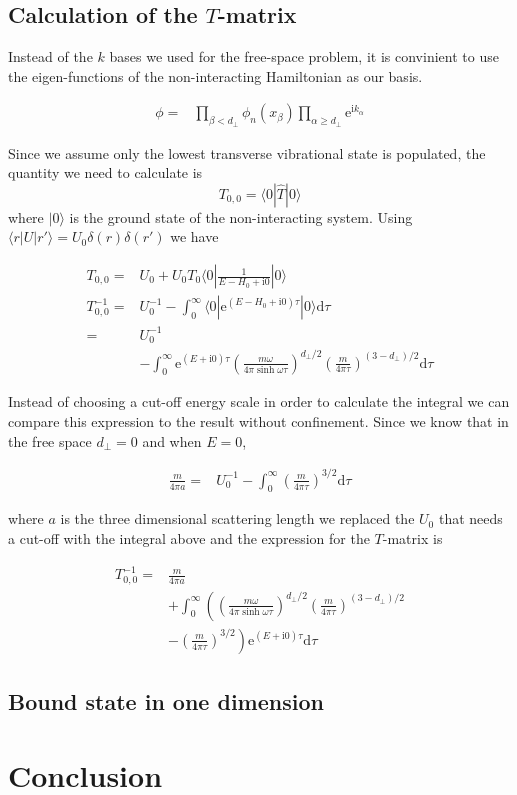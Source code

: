 \documentclass[aps,twocolumn,secnumarabic,balancelastpage,amsmath,amssymb,nofootinbib]{revtex4}
\newcommand{\ud}{\mathrm{d}}
\newcommand{\ue}{\mathrm{e}}
\newcommand{\ui}{\mathrm{i}}
\newcommand{\eqar}[1]
{
  \begin{align*}
    #1
  \end{align*}
}
\newcommand{\paren}[1]{{\left({#1}\right)}}
\newcommand{\lparen}[1]{{\left({#1}\right.}}
\newcommand{\rparen}[1]{{\left.{#1}\right)}}
\begin{document}
\subsection{Calculation of the $T$-matrix}
Instead of the $k$ bases we used for the free-space problem, it is convinient to use the eigen-functions of the non-interacting Hamiltonian as our basis.
\eqar{
  \phi=&\prod_{\beta<d_\perp}\phi_n\paren{x_\beta}\prod_{\alpha\geqslant d_\perp}\ue^{\ui k_\alpha}
}
Since we assume only the lowest transverse vibrational state is populated, the quantity we need to calculate is
\[T_{0,0}=\langle0|\hat T|0\rangle\]
where $|0\rangle$ is the ground state of the non-interacting system. Using $\langle r|U|r'\rangle=U_0\delta\paren{r}\delta\paren{r'}$ we have
\eqar{
  T_{0,0}=&U_0+U_0T_0\langle0|\frac{1}{E-H_0+\ui0}|0\rangle\\
  T_{0,0}^{-1}=&U_0^{-1}-\int_0^\infty\langle0|\ue^{\paren{E-H_0+\ui0}\tau}|0\rangle\ud\tau\\
  =&U_0^{-1}\\
  &-\int_0^\infty\ue^{\paren{E+\ui0}\tau}\paren{\frac{m\omega}{4\pi\sinh\omega\tau}}^{d_\perp/2}\paren{\frac{m}{4\pi\tau}}^{\paren{3-d_\perp}/2}\ud\tau
}
Instead of choosing a cut-off energy scale in order to calculate the integral we can compare this expression to the result without confinement. Since we know that in the free space $d_\perp=0$ and when $E=0$,
\eqar{
  \frac{m}{4\pi a}=&U_0^{-1}-\int_0^\infty\paren{\frac{m}{4\pi\tau}}^{3/2}\ud\tau
}
where $a$ is the three dimensional scattering length we replaced the $U_0$ that needs a cut-off with the integral above and the expression for the $T$-matrix is
\eqar{
  T_{0,0}^{-1}=&\frac{m}{4\pi a}\\
  &+\int_{0}^{\infty}\lparen{\paren{\frac{m\omega}{4\pi\sinh\omega\tau}}^{d_\perp/2}\paren{\frac{m}{4\pi\tau}}^{\paren{3-d_\perp}/2}}\\
  &\rparen{-\paren{\frac{m}{4\pi\tau}}^{3/2}}\ue^{\paren{E+\ui0}\tau}\ud\tau
}

\subsection{Bound state in one dimension}

\section{Conclusion}


\end{document}
